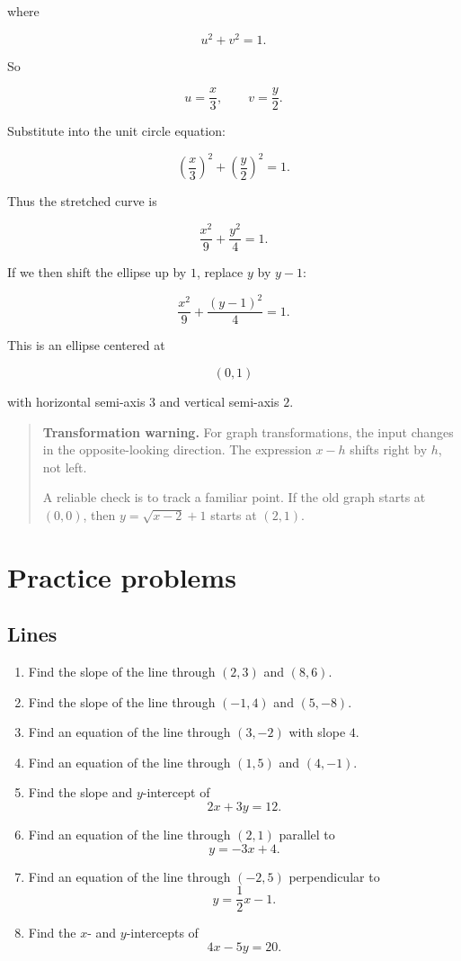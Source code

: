where

\[
u^2+v^2=1.
\]

So

\[
u=\frac{x}{3},
\qquad
v=\frac{y}{2}.
\]

Substitute into the unit circle equation:

\[
\left(\frac{x}{3}\right)^2+\left(\frac{y}{2}\right)^2=1.
\]

Thus the stretched curve is

\[
\boxed{
\frac{x^2}{9}+\frac{y^2}{4}=1.
}
\]

If we then shift the ellipse up by \(1\), replace \(y\) by \(y-1\):

\[
\boxed{
\frac{x^2}{9}+\frac{(y-1)^2}{4}=1.
}
\]

This is an ellipse centered at

\[
(0,1)
\]

with horizontal semi-axis \(3\) and vertical semi-axis \(2\).

\begin{quote}
\textbf{Transformation warning.}
For graph transformations, the input changes in the opposite-looking direction.
The expression \(x-h\) shifts right by \(h\), not left.

A reliable check is to track a familiar point.  If the old graph starts at \((0,0)\),
then \(y=\sqrt{x-2}+1\) starts at \((2,1)\).
\end{quote}

\section{Practice problems}
\label{appsec:coordinate-geometry-practice}

\subsection*{Lines}

\begin{enumerate}
\item Find the slope of the line through \((2,3)\) and \((8,6)\).

\item Find the slope of the line through \((-1,4)\) and \((5,-8)\).

\item Find an equation of the line through \((3,-2)\) with slope \(4\).

\item Find an equation of the line through \((1,5)\) and \((4,-1)\).

\item Find the slope and \(y\)-intercept of
\[
2x+3y=12.
\]

\item Find an equation of the line through \((2,1)\) parallel to
\[
y=-3x+4.
\]

\item Find an equation of the line through \((-2,5)\) perpendicular to
\[
y=\frac12x-1.
\]

\item Find the \(x\)- and \(y\)-intercepts of
\[
4x-5y=20.
\]
\end{enumerate}

